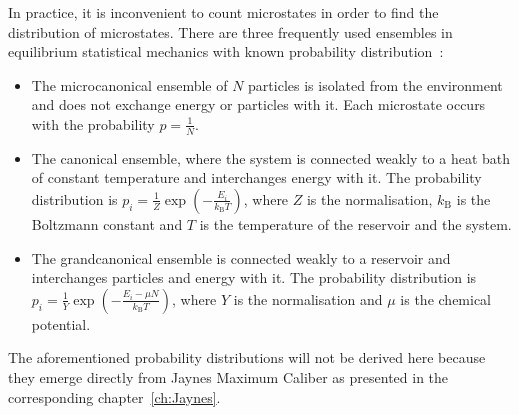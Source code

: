 In practice, it is inconvenient to count microstates in order to find the distribution of microstates. There are three frequently used ensembles in equilibrium statistical mechanics with known probability distribution~\cite{schwabl2006statistische}: 
\begin{itemize}
 \item The microcanonical ensemble of $N$ particles is isolated from the environment and does not exchange energy or particles with it. Each microstate occurs with the probability $p = \frac{1}{N}$.
 \item The canonical ensemble, where the system is connected weakly to a heat bath of constant temperature and interchanges energy with it. The probability distribution is  $p_i = \frac{1}{Z}\exp \left( -\frac{E_i}{k_{\textrm{B}} T} \right ) $, where $Z$ is the normalisation, $k_{\textrm{B}}$ is the Boltzmann constant and $T$ is the temperature of the reservoir and the system.  
 \item The grandcanonical ensemble is connected weakly to a reservoir and interchanges particles and energy with it. The probability distribution is  $p_i = \frac{1}{Y}\exp \left( -\frac{ E_i - \mu N}{k_{\textrm{B}} T} \right )$, where $Y$ is the normalisation and $\mu$ is the chemical potential.
\end{itemize}
The aforementioned probability distributions will not be derived here because they emerge directly from Jaynes Maximum Caliber as presented in the corresponding chapter~\ref{ch:Jaynes}.

